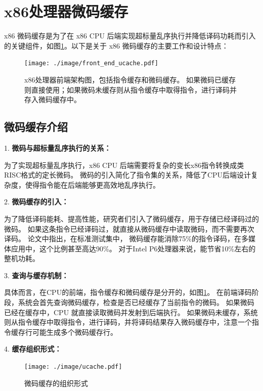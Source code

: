 \section{x86处理器微码缓存}\label{sec:complex_isa}

x86 微码缓存是为了在 x86 CPU 后端实现超标量乱序执行并降低译码功耗而引入的关键组件\cite{solomonMicrooperationCachePower2001}，如图\ref{img:front_end_ucache}。以下是关于 x86 微码缓存的主要工作和设计特点：

\begin{figure}[!htbp]
  \centering
  \texttt{[image: ./image/front\_end\_ucache.pdf]}
  \caption{x86处理器前端架构图，包括指令缓存和微码缓存。
  如果微码已缓存则直接使用；如果微码未缓存则从指令缓存中取得指令，进行译码并存入微码缓存中。}
  \label{img:front_end_ucache}
\end{figure}

\subsection{微码缓存介绍}

1. \textbf{微码与超标量乱序执行的关系：}

为了实现超标量乱序执行，x86 CPU 后端需要将复杂的变长x86指令转换成类RISC格式的定长微码。
微码的引入简化了指令集的关系，降低了CPU后端设计复杂度，使得指令能在后端能够更高效地乱序执行。

2. \textbf{微码缓存的引入：}

为了降低译码能耗、提高性能，研究者们引入了微码缓存，用于存储已经译码过的微码。
如果这条指令已经译码过，就直接从微码缓存中读取微码，而不需要再次译码。
\cite{solomonMicrooperationCachePower2001}论文中指出，在标准测试集中，
微码缓存能消除75\%的指令译码，在多媒体应用中，这个比例甚至高达90\%。
对于Intel P6处理器来说，能节省10\%左右的整机功耗。

3. \textbf{查询与缓存机制：}

具体而言，在CPU的前端，指令缓存和微码缓存是分开的，如图\ref{img:front_end_ucache}。
在前端译码阶段，系统会首先查询微码缓存，检查是否已经缓存了当前指令的微码。
如果微码已经在缓存中，CPU 就直接读取微码并发射到后端执行。
如果微码未缓存，系统则从指令缓存中取得指令，进行译码，并将译码结果存入微码缓存中，注意一个指令缓存行可能生成多个微码缓存行。

4. \textbf{缓存组织形式：}

\begin{figure}[!htbp]
  \centering
  \texttt{[image: ./image/ucache.pdf]}
  \caption{微码缓存的组织形式}
  \label{img:ucache}
\end{figure}

